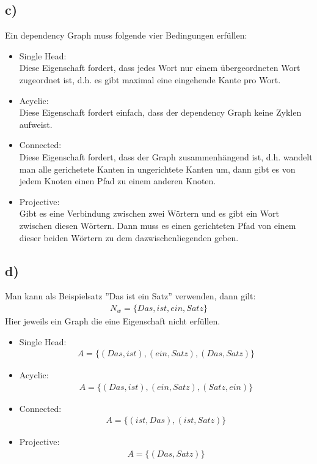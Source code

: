 \documentclass[a4paper,11pt,fleqn]{scrartcl}
\begin{document}
\subsection*{c)}
Ein dependency Graph muss folgende vier Bedingungen erfüllen:
\begin{itemize}
 \item Single Head: \\
 Diese Eigenschaft fordert, dass jedes Wort nur einem übergeordneten Wort zugeordnet ist, d.h. es gibt maximal eine eingehende Kante pro Wort. 
 \item Acyclic: \\
  Diese Eigenschaft fordert einfach, dass der dependency Graph keine Zyklen aufweist.   
 \item Connected: \\
 Diese Eigenschaft fordert, dass der Graph zusammenhängend ist, d.h. wandelt man alle gerichetete Kanten in ungerichtete Kanten um, dann gibt es von jedem Knoten einen Pfad zu einem anderen Knoten. 
 \item Projective: \\
 Gibt es eine Verbindung zwischen zwei Wörtern und es gibt ein Wort zwischen diesen Wörtern. Dann muss es einen gerichteten Pfad von einem dieser beiden Wörtern zu dem dazwischenliegenden geben.    
\end{itemize}

\subsection*{d)}

Man kann als Beispielsatz ''Das ist ein Satz'' verwenden, dann gilt:
\begin{align*}
N_w = \{Das, ist, ein, Satz\}
\end{align*}
Hier jeweils ein Graph die eine Eigenschaft nicht erfüllen. 
\begin{itemize}
\item Single Head:
\begin{align*}
A = \{(Das,ist),(ein,Satz),(Das, Satz)\}
\end{align*}
\item Acyclic:
\begin{align*}
A = \{(Das,ist),(ein,Satz),(Satz,ein)\}
\end{align*}
\item Connected:
\begin{align*}
A = \{(ist,Das),(ist,Satz)\}
\end{align*}
\item Projective:
\begin{align*}
A = \{(Das,Satz)\}
\end{align*}
\end{itemize}
\end{document}
